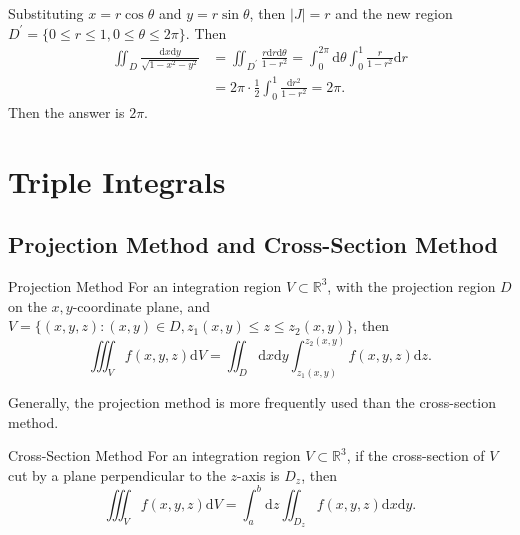 \begin{solution}
  Substituting $x = r \cos \theta$ and $y = r \sin \theta$,
  then $|J| = r$ and the new region $D^{\prime} = \{0 \leq r \leq 1, 0 \leq
  \theta \leq 2\pi\}$. Then
  \begin{align}
    \iint_D \frac{\mathrm{d} x\mathrm{d} y}{\sqrt{1 - x^2 - y^2}}
    &= \iint _{D^{\prime}} \frac{r \mathrm{d}r \mathrm{d}\theta}{1 - r^2}
     = \int_0^{2\pi} \mathrm{d} \theta \int_0^1 \frac{r}{1-r^2}\mathrm{d} r\\
    &= 2\pi \cdot \frac{1}{2}\int_0^1 \frac{\mathrm{d} r^2}{1 - r^2}
     = 2\pi.
  \end{align}
  Then the answer is $2\pi$.
\end{solution}

\section{Triple Integrals}

\subsection{Projection Method and Cross-Section Method}

\begin{proposition}{Projection Method}{}
  For an integration region $V \subset \mathbb{R}^3$,
  with the projection region $D$ on the $x,y$-coordinate plane, and
  $V = \{(x,y,z): (x, y) \in D, z_1(x, y) \leq z \leq z_2(x,y)\}$, then
  \begin{equation}
    \iiint _V f(x,y,z) \mathrm{d}V = \iint _D \mathrm{d}x \mathrm{d}y \int _{z_1(x,y)}^{z_2(x,y)}f(x,y,z)\mathrm{d}z.
  \end{equation}
\end{proposition}

\begin{note}
  Generally, the projection method is more frequently used than the
  cross-section method.
\end{note}

\begin{proposition}{Cross-Section Method}{}
  For an integration region $V \subset \mathbb{R}^3$,
  if the cross-section of $V$ cut by a plane perpendicular
  to the $z$-axis is $D_z$, then
  \begin{equation}
    \iiint _Vf(x,y,z) \mathrm{d}V = \int ^b_a \mathrm{d}z \iint _{D_z}f(x,y,z)\mathrm{d}x\mathrm{d}y.
  \end{equation}
\end{proposition}

